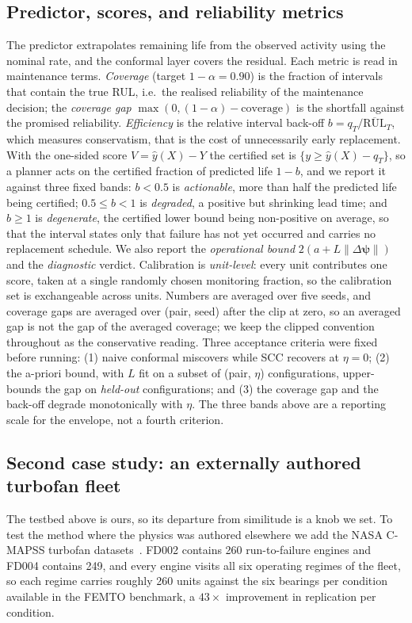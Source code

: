 \subsection{Predictor, scores, and reliability metrics}\label{sec:metrics}
The predictor extrapolates remaining life from the observed activity using the nominal rate, and the
conformal layer covers the residual. Each metric is read in maintenance terms. \emph{Coverage}
(target $1-\alpha=0.90$) is the fraction of intervals that contain the true RUL, i.e.\ the realised
reliability of the maintenance decision; the \emph{coverage gap} $\max(0,(1-\alpha)-\text{coverage})$
is the shortfall against the promised reliability. \emph{Efficiency} is the relative interval
back-off $b=q_T/\overline{\text{RUL}}_T$, which measures conservatism, that is the cost of
unnecessarily early replacement. With the one-sided score $V=\hat y(X)-Y$ the certified set is
$\{y\ge\hat y(X)-q_T\}$, so a planner acts on the certified fraction of predicted life $1-b$, and
we report it against three fixed bands: $b<0.5$ is
\emph{actionable}, more than half the predicted life being certified; $0.5\le b<1$ is
\emph{degraded}, a positive but shrinking lead time; and $b\ge1$ is \emph{degenerate}, the certified
lower bound being non-positive on average, so that the interval states only that failure has not
yet occurred and carries no replacement schedule. We also report the \emph{operational bound}
$2(a+L\lVert\Delta\boldsymbol\psi\rVert)$ and
the \emph{diagnostic} verdict. Calibration is \emph{unit-level}: every unit contributes one
score, taken at a single randomly chosen monitoring fraction, so the calibration set is
exchangeable across units. Numbers are averaged over five seeds, and coverage gaps are averaged
over (pair, seed) after the clip at zero, so an averaged gap is not the gap of the averaged
coverage; we keep the clipped convention throughout as the conservative reading. Three acceptance
criteria were fixed before running: (1) naive conformal miscovers while SCC recovers at $\eta=0$; (2) the a-priori
bound, with $L$ fit on a subset of (pair, $\eta$) configurations, upper-bounds the gap on
\emph{held-out} configurations; and (3) the coverage gap and the back-off degrade monotonically
with $\eta$. The three bands above are a reporting scale for the envelope, not a fourth criterion.

\subsection{Second case study: an externally authored turbofan fleet}\label{sec:cmapss}
The testbed above is ours, so its departure from similitude is a knob we set. To test the method
where the physics was authored elsewhere we add the NASA C-MAPSS turbofan
datasets~\cite{saxena2008cmapss,saxena2008damage}. FD002 contains 260 run-to-failure engines and
FD004 contains 249, and every engine visits all six operating regimes of the fleet, so each regime
carries roughly 260 units against the six bearings per condition available in the FEMTO benchmark,
a $43\times$ improvement in replication per condition.

